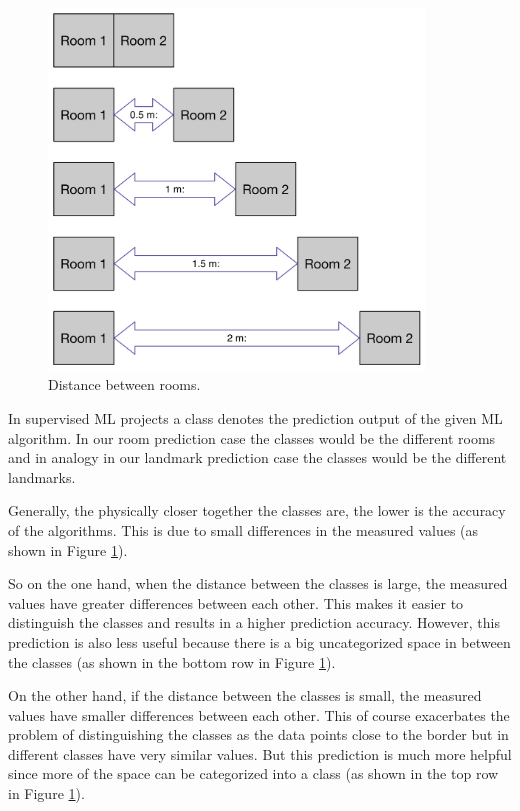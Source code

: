 \begin{figure}[H]
\centering
\includegraphics[width=100mm]{Figures/Distance.jpg}
\decoRule
\caption[Distance]{Distance between rooms.}
\label{fig:Distance}
\end{figure}

In supervised ML projects a class denotes the prediction output of the given ML algorithm. In our room prediction case the classes would be the different rooms and in analogy in our landmark prediction case the classes would be the different landmarks.

Generally, the physically closer together the classes are, the lower is the accuracy of the algorithms. This is due to small differences in the measured values (as shown in Figure \ref{fig:Distance}).

So on the one hand, when the distance between the classes is large, the measured values have greater differences between each other. This makes it easier to distinguish the classes and results in a higher prediction accuracy. However, this prediction is also less useful because there is a big uncategorized space in between the classes (as shown in the bottom row in Figure \ref{fig:Distance}).

On the other hand, if the distance between the classes is small, the measured values have smaller differences between each other. This of course exacerbates the problem of distinguishing the classes as the data points close to the border but in different classes have very similar values. But this prediction is much more helpful since more of the space can be categorized into a class (as shown in the top row in Figure \ref{fig:Distance}).

